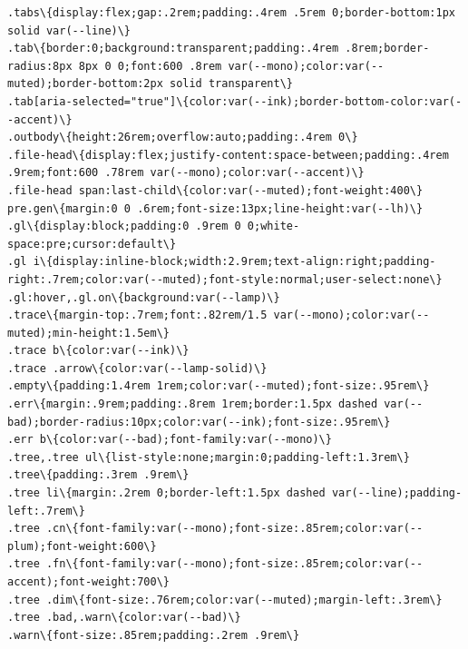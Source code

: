 \documentclass[10pt,a4paper]{article}
\begin{document}
\begin{Verbatim}
.tabs\{display:flex;gap:.2rem;padding:.4rem .5rem 0;border-bottom:1px solid var(--line)\}
.tab\{border:0;background:transparent;padding:.4rem .8rem;border-radius:8px 8px 0 0;font:600 .8rem var(--mono);color:var(--muted);border-bottom:2px solid transparent\}
.tab[aria-selected="true"]\{color:var(--ink);border-bottom-color:var(--accent)\}
.outbody\{height:26rem;overflow:auto;padding:.4rem 0\}
.file-head\{display:flex;justify-content:space-between;padding:.4rem .9rem;font:600 .78rem var(--mono);color:var(--accent)\}
.file-head span:last-child\{color:var(--muted);font-weight:400\}
pre.gen\{margin:0 0 .6rem;font-size:13px;line-height:var(--lh)\}
.gl\{display:block;padding:0 .9rem 0 0;white-space:pre;cursor:default\}
.gl i\{display:inline-block;width:2.9rem;text-align:right;padding-right:.7rem;color:var(--muted);font-style:normal;user-select:none\}
.gl:hover,.gl.on\{background:var(--lamp)\}
.trace\{margin-top:.7rem;font:.82rem/1.5 var(--mono);color:var(--muted);min-height:1.5em\}
.trace b\{color:var(--ink)\}
.trace .arrow\{color:var(--lamp-solid)\}
.empty\{padding:1.4rem 1rem;color:var(--muted);font-size:.95rem\}
.err\{margin:.9rem;padding:.8rem 1rem;border:1.5px dashed var(--bad);border-radius:10px;color:var(--ink);font-size:.95rem\}
.err b\{color:var(--bad);font-family:var(--mono)\}
.tree,.tree ul\{list-style:none;margin:0;padding-left:1.3rem\}
.tree\{padding:.3rem .9rem\}
.tree li\{margin:.2rem 0;border-left:1.5px dashed var(--line);padding-left:.7rem\}
.tree .cn\{font-family:var(--mono);font-size:.85rem;color:var(--plum);font-weight:600\}
.tree .fn\{font-family:var(--mono);font-size:.85rem;color:var(--accent);font-weight:700\}
.tree .dim\{font-size:.76rem;color:var(--muted);margin-left:.3rem\}
.tree .bad,.warn\{color:var(--bad)\}
.warn\{font-size:.85rem;padding:.2rem .9rem\}
\end{Verbatim}
\end{document}
